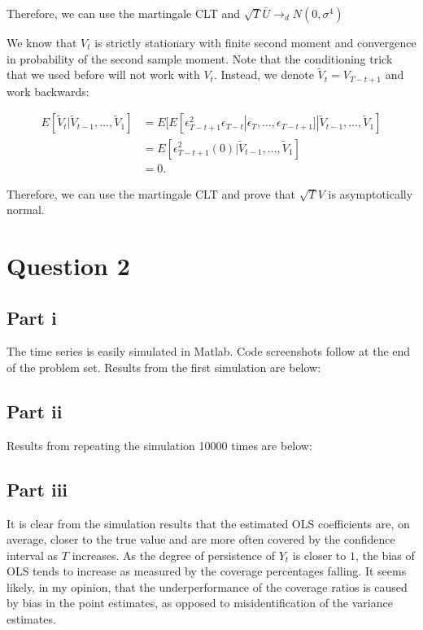 \documentclass[11pt]{article} %
\begin{document}
Therefore, we can use the martingale CLT and $\sqrt{T}\bar{U}\rightarrow_d N(0,\sigma^4)$

We know that $V_t$ is strictly stationary with finite second moment and convergence in probability of the second sample moment. Note that the conditioning trick that we used before will not work with $V_t$. Instead, we denote $\tilde{V}_t = V_{T-t+1}$ and work backwards:

\begin{align*}
E[\tilde{V}_t|\tilde{V}_{t-1},\dots,\tilde{V}_1] &=E[E[\epsilon_{T-t+1}^2\epsilon_{T-t}|\epsilon_T,\dots,\epsilon_{T-t+1}]|\tilde{V}_{t-1},\dots,\tilde{V}_1]\\
&=E[\epsilon_{T-t+1}^2(0)|\tilde{V}_{t-1},\dots,\tilde{V}_1]\\
&= 0.
\end{align*}

Therefore, we can use the martingale CLT and prove that $\sqrt{T}V$ is asymptotically normal.

\section{Question 2}
\subsection{Part i}
The time series is easily simulated in Matlab. Code screenshots follow at the end of the problem set. Results from the first simulation are below:

\begin{centering}

\end{centering}
\subsection{Part ii}
Results from repeating the simulation 10000 times are below:

\begin{centering}

\end{centering}
\subsection{Part iii}
It is clear from the simulation results that the estimated OLS coefficients are, on average, closer to the true value and are more often covered by the confidence interval as $T$ increases. As the degree of persistence of $Y_t$ is closer to $1$, the bias of OLS tends to increase as measured by the coverage percentages falling. It seems likely, in my opinion, that the underperformance of the coverage ratios is caused by bias in the point estimates, as opposed to misidentification of the variance estimates.
\end{document}
